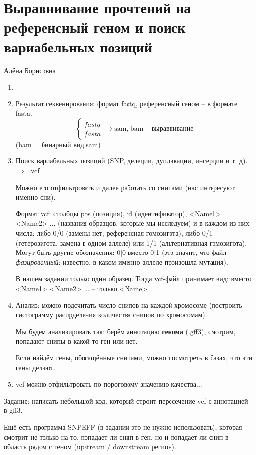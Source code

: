 \documentclass[main.tex]{subfiles}
\begin{document}
\section{ Выравнивание прочтений на референсный геном и поиск вариабельных позиций}

Алёна Борисовна

\begin{enumerate}[noitemsep]
	\item
	\item Результат секвенирования: формат fastq, референсный геном -- в формате fasta.
	$$ \begin{cases}
	fastq \\
	fasta
	\end{cases} \to \text{sam, bam -- выравнивание} $$  (bam = бинарный вид sam)
	\item Поиск вариабельных позиций (SNP, делеции, дупликации, инсерции и т. д). $ \Rightarrow $ .vcf
	
	Можно его отфильтровать и далее работать со снипами (нас интересуют именно они).
	
	Формат vcf: столбцы pos (позиция), id (идентификатор), <Name1> <Name2> ... (названия образцов, которые мы исследуем) и в каждом из них числа: либо 0/0 (замены нет, референсная гомозигота), либо 0/1 (гетерозигота, замена в одном аллеле) или 1/1 (альтернативная гомозигота).
	Могут быть другие обозначения: 0|0 вместо 0|1 (это значит, что файл \emph{фазированный}: известно, в каком именно аллеле произошла мутация).
	
	В нашем задании только один образец.
	Тогда vcf-файл принимает вид: вместо <Name1> <Name2> ... -- только <Name> 
	
	\item Анализ: можно подсчитать число снипов на каждой хромосоме (построить гистограмму распрделения количества снипов по хромосомам).
	
	Мы будем анализировать так: берём аннотацию \textbf{генома} (.gff3), смотрим, попадают снипы в какой-то ген или нет.
	
	Если найдём гены, обогащённые снипами, можно посмотреть в базах, что эти гены делают.
	
	
	\item vcf можно отфильтровать по пороговому значению качества...
	
\end{enumerate}

Задание: написать небольшой код, который строит пересечение vcf с аннотацией в gff3.
\begin{leftbar}
	Ещё есть программа SNPEFF (в задании это не нужно использовать), которая смотрит не только на то, попадает ли снип в ген, но и попадает ли снип в область рядом с геном (upstream / downstream регион).
\end{leftbar}
\end{document}
